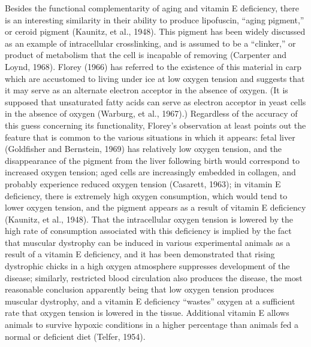 Besides the functional complementarity of aging and vitamin E deficiency, there is an interesting similarity in their ability to produce lipofuscin, ``aging pigment,'' or ceroid pigment (Kaunitz, et al., 1948). This pigment has been widely discussed as an example
of intracellular crosslinking, and is assumed to be a ``clinker,'' or product of metabolism that the cell is incapable of removing (Carpenter and Loynd, 1968). Florey (1966) has referred to the existence of this material in carp which are accustomed to living under
ice at low oxygen tension and suggests that it may serve as an alternate electron acceptor in the absence of oxygen. (It is supposed that unsaturated fatty acids can serve as electron acceptor in yeast
cells in the absence of oxygen (Warburg, et al., 1967).) Regardless of the accuracy of this guess concerning its functionality, Florey's observation at least points out the feature that is common to the various situations in which it appears: fetal liver (Goldfisher and
Bernstein, 1969) has relatively low oxygen tension, and the disappearance of the pigment from the liver following birth would correspond to increased oxygen tension; aged cells are increasingly embedded in collagen, and probably experience reduced oxygen tension (Casarett, 1963); in
vitamin E deficiency, there is extremely high oxygen consumption, which would tend to lower oxygen tension, and the pigment appears as a result of vitamin E deficiency (Kaunitz, et al., 1948). That the intracellular oxygen tension is lowered by the high rate
of consumption associated with this deficiency is implied by the fact that muscular dystrophy can be induced in various experimental animals as a result of a vitamin E deficiency, and it has been demonstrated that rising dystrophic chicks in a high oxygen atmosphere
suppresses development of the disease; similarly, restricted blood circulation also produces the disease, the most reasonable conclusion apparently being that low oxygen tension produces muscular dystrophy, and a vitamin E deficiency ``wastes'' oxygen at a sufficient
rate that oxygen tension is lowered in the tissue. Additional vitamin E allows animals to survive hypoxic conditions in a higher percentage than animals fed a normal or deficient diet (Telfer, 1954).

